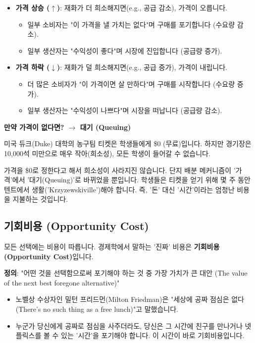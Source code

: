 \documentclass[11pt,a4paper]{article}
\theoremstyle{definition}
\begin{document}
\begin{itemize}
    \item \textbf{가격 상승 ($\uparrow$)}: 재화가 더 희소해지면(e.g., 공급 감소), 가격이 오릅니다.
        \begin{itemize}
            \item 일부 소비자는 "이 가격을 낼 가치는 없다"며 구매를 포기합니다 (수요량 감소).
            \item 일부 생산자는 "수익성이 좋다"며 시장에 진입합니다 (공급량 증가).
        \end{itemize}
    \item \textbf{가격 하락 ($\downarrow$)}: 재화가 덜 희소해지면(e.g., 공급 증가), 가격이 내립니다.
        \begin{itemize}
            \item 더 많은 소비자가 "이 가격이면 살 만하다"며 구매를 시작합니다 (수요량 증가).
            \item 일부 생산자는 "수익성이 나쁘다"며 시장을 떠납니다 (공급량 감소).
        \end{itemize}
\end{itemize}

\begin{warningbox}
\textbf{만약 가격이 없다면? $\rightarrow$ 대기 (Queuing)}

미국 듀크(Duke) 대학의 농구팀 티켓은 학생들에게 \$0 (무료)입니다.
    하지만 경기장은 10,000석 미만으로 매우 작아(희소성), 모든 학생이 들어갈 수 없습니다.

    가격을 \$0로 정한다고 해서 희소성이 사라지진 않습니다.
    단지 배분 메커니즘이 '가격'에서 '대기(Queuing)'로 바뀌었을 뿐입니다. 학생들은 티켓을 얻기 위해 몇 주 동안 텐트에서 생활('Krzyzewskiville')해야 합니다.
    즉, '돈' 대신 '시간'이라는 엄청난 비용을 지불하는 것입니다.
\end{warningbox}

\subsection{기회비용 (Opportunity Cost)}

모든 선택에는 비용이 따릅니다. 경제학에서 말하는 '진짜' 비용은 \textbf{기회비용(Opportunity Cost)}입니다.

\textbf{정의}: "어떤 것을 선택함으로써 포기해야 하는 것 중 가장 가치가 큰 대안 (The value of the next best foregone alternative)"

\begin{itemize}
    \item 노벨상 수상자인 밀턴 프리드먼(Milton Friedman)은 "세상에 공짜 점심은 없다(There's no such thing as a free lunch)"고 말했습니다.
    \item 누군가 당신에게 공짜로 점심을 사주더라도, 당신은 그 시간에 친구를 만나거나 넷플릭스를 볼 수 있는 '시간'을 포기해야 합니다. 이 시간이 바로 기회비용입니다.
\end{itemize}
\end{document}
